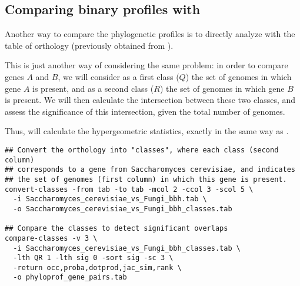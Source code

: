\subsection{Comparing binary profiles with }

Another way to compare the phylogenetic profiles is to directly
analyze with  the table of orthology
(previously obtained from ).

This is just another way of considering the same problem: in order to
compare genes $A$ and $B$, we will consider as a first class ($Q$) the
set of genomes in which gene $A$ is present, and as a second class
($R$) the set of genomes in which gene $B$ is present. We will then
calculate the intersection between these two classes, and assess the
significance of this intersection, given the total number of
genomes.

Thus,  will calculate the hypergeometric
statistics, exactly in the same way as . 

\begin{footnotesize}
\begin{verbatim}
## Convert the orthology into "classes", where each class (second column)
## corresponds to a gene from Saccharomyces cerevisiae, and indicates 
## the set of genomes (first column) in which this gene is present. 
convert-classes -from tab -to tab -mcol 2 -ccol 3 -scol 5 \
  -i Saccharomyces_cerevisiae_vs_Fungi_bbh.tab \
  -o Saccharomyces_cerevisiae_vs_Fungi_bbh_classes.tab

## Compare the classes to detect significant overlaps
compare-classes -v 3 \
  -i Saccharomyces_cerevisiae_vs_Fungi_bbh_classes.tab \
  -lth QR 1 -lth sig 0 -sort sig -sc 3 \
  -return occ,proba,dotprod,jac_sim,rank \
  -o phyloprof_gene_pairs.tab
\end{verbatim}
\end{footnotesize}
